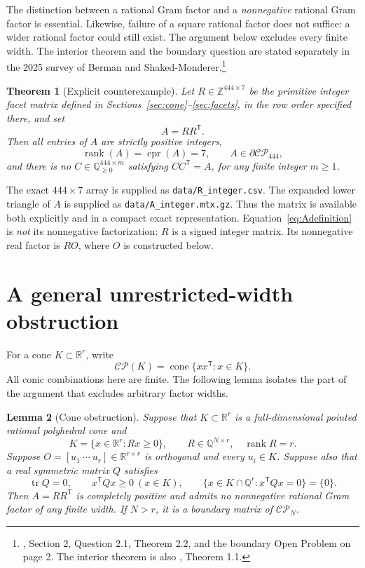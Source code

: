 \documentclass[11pt]{article}
\newtheorem{theorem}{Theorem}[section]
\newtheorem{lemma}[theorem]{Lemma}
\theoremstyle{definition}
\newcommand{\R}{\mathbb R}
\newcommand{\Q}{\mathbb Q}
\newcommand{\Z}{\mathbb Z}
\newcommand{\CP}{\mathcal{CP}}
\newcommand{\cone}{\operatorname{cone}}
\newcommand{\rank}{\operatorname{rank}}
\newcommand{\tr}{\operatorname{tr}}
\newcommand{\cpr}{\operatorname{cpr}}
\newcommand{\trans}{^{\mathsf T}}
\numberwithin{equation}{section}
\begin{document}
The distinction between a rational Gram factor and a \emph{nonnegative}
rational Gram factor is essential. Likewise, failure of a square rational
factor does not suffice: a wider rational factor could still exist. The
argument below excludes every finite width. The interior theorem and the
boundary question are stated separately in the 2025 survey of Berman and
Shaked-Monderer.\footnote{\cite{bsm}, Section 2, Question 2.1, Theorem 2.2,
and the boundary Open Problem on page 2. The interior theorem is also
\cite{dsv}, Theorem 1.1.}

\begin{theorem}[Explicit counterexample]\label{thm:main}
Let $R\in\Z^{444\times7}$ be the primitive integer facet matrix defined in
Sections~\ref{sec:cone}--\ref{sec:facets}, in the row order specified there,
and set
\begin{equation}\label{eq:Adefinition}
 A=RR\trans.
\end{equation}
Then all entries of $A$ are strictly positive integers,
\[
 \rank(A)=\cpr(A)=7,\qquad A\in\partial\CP_{444},
\]
and there is no $C\in\Q_{\geq0}^{444\times m}$ satisfying $CC\trans=A$,
for any finite integer $m\geq1$.
\end{theorem}

The exact $444\times7$ array is supplied as \texttt{data/R\_integer.csv}.
The expanded lower triangle of $A$ is supplied as
\texttt{data/A\_integer.mtx.gz}. Thus the matrix is available both explicitly
and in a compact exact representation. Equation~\eqref{eq:Adefinition} is
\emph{not} its nonnegative factorization: $R$ is a signed integer matrix.
Its nonnegative real factor is $RO$, where $O$ is constructed below.

\section{A general unrestricted-width obstruction}\label{sec:obstruction}
For a cone $K\subset\R^r$, write
\[
 \CP(K)=\cone\{xx\trans:x\in K\}.
\]
All conic combinations here are finite. The following lemma isolates the
part of the argument that excludes arbitrary factor widths.

\begin{lemma}[Cone obstruction]\label{lem:obstruction}
Suppose that $K\subset\R^r$ is a full-dimensional pointed rational
polyhedral cone and
\[
 K=\{x\in\R^r:Rx\geq0\},\qquad R\in\Q^{N\times r},\quad \rank R=r.
\]
Suppose $O=[u_1\ \cdots\ u_r]\in\R^{r\times r}$ is orthogonal and every
$u_i\in K$. Suppose also that a real symmetric matrix $Q$ satisfies
\begin{equation}\label{eq:abstractconditions}
 \tr Q=0,\qquad x\trans Qx\geq0\ (x\in K),\qquad
 \{x\in K\cap\Q^r:x\trans Qx=0\}=\{0\}.
\end{equation}
Then $A=RR\trans$ is completely positive and admits no nonnegative rational
Gram factor of any finite width. If $N>r$, it is a boundary matrix of $\CP_N$.
\end{lemma}
\end{document}
